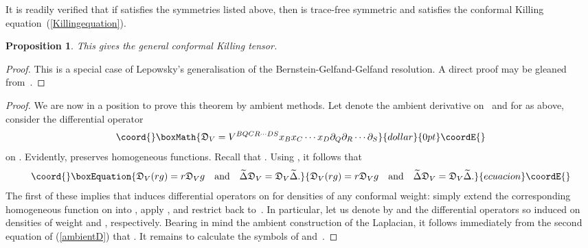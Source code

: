 \documentclass[a4paper,12pt]{amsart}
\newtheorem{prop}{Proposition}
\begin{document}
It is readily verified that if \coordHE{} satisfies the
symmetries listed above, then \coordHE{} is trace-free symmetric and
satisfies the conformal Killing equation~(\ref{Killingequation}).
\begin{prop}\label{generalsolution}
This gives the general conformal Killing tensor.\end{prop}
\begin{proof} This is a special case of Lepowsky's generalisation \cite{l} of
the Bernstein-Gelfand-Gelfand resolution. A direct proof may be gleaned
from~\cite{g}. \end{proof}
\renewcommand{\proofname}{Proof of Theorem~\ref{existence}}\begin{proof}
We are now in a position to prove this theorem by ambient methods. Let
\coordHE{} denote the ambient derivative \coordHE{}
on~\coordHE{} and for \coordHE{} as above, consider the
differential operator $$\coord{}\boxMath{{\mathfrak D}_V=V^{BQCR\cdots DS}
x_Bx_C\cdots x_D\partial_Q\partial_R\cdots\partial_S}{dollar}{0pt}\coordE{}$$
on \coordHE{}. Evidently, \coordHE{} preserves homogeneous
functions. Recall that \coordHE{}. Using \coordHE{}, it follows that
\begin{equation}\coord{}\boxEquation{\label{ambientD}
{\mathfrak D}_V(rg)=r{\mathfrak D}_Vg\quad\mbox{and}\quad
\widetilde\Delta{\mathfrak D}_V={\mathfrak D}_V\widetilde\Delta.}{{\mathfrak D}_V(rg)=r{\mathfrak D}_Vg\quad\mbox{and}\quad
\widetilde\Delta{\mathfrak D}_V={\mathfrak D}_V\widetilde\Delta.}{ecuacion}\coordE{}\end{equation}
The first of these implies that \coordHE{} induces differential
operators on \coordHE{} for densities of any conformal weight: simply
extend the corresponding homogeneous function on \coordHE{} into
\coordHE{}, apply \coordHE{}, and restrict back to~\coordHE{}. In particular, let us denote by \coordHE{} and \coordHE{} the
differential operators so induced on densities of weight \coordHE{} and \coordHE{},
respectively. Bearing in mind the ambient construction of the Laplacian, it
follows immediately from the second equation of (\ref{ambientD}) that
\coordHE{}. It remains to calculate the symbols
of \coordHE{} and~\coordHE{}.


\end{proof}
\end{document}
